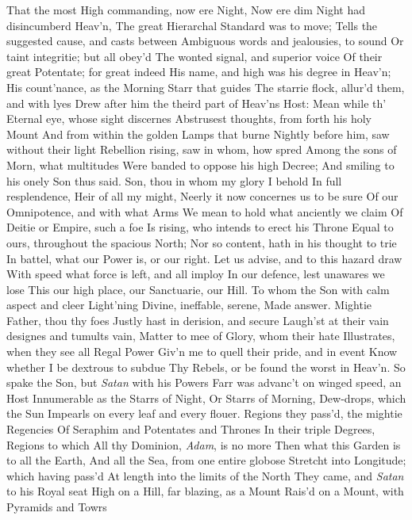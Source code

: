 \documentclass[11pt]{book}
\begin{document}
That the most High commanding, now ere Night, 
Now ere dim Night had disincumberd Heav'n, 
The great Hierarchal Standard was to move; 
Tells the suggested cause, and casts between 
Ambiguous words and jealousies, to sound 
Or taint integritie; but all obey'd 
The wonted signal, and superior voice 
Of their great Potentate; for great indeed 
His name, and high was his degree in Heav'n; 
His count'nance, as the Morning Starr that guides 
The starrie flock, allur'd them, and with lyes 
Drew after him the theird part of Heav'ns Host: 
Mean while th' Eternal eye, whose sight discernes 
Abstrusest thoughts, from forth his holy Mount 
And from within the golden Lamps that burne 
Nightly before him, saw without their light 
Rebellion rising, saw in whom, how spred 
Among the sons of Morn, what multitudes 
Were banded to oppose his high Decree; 
And smiling to his onely Son thus said. 
\quad Son, thou in whom my glory I behold 
In full resplendence, Heir of all my might, 
Neerly it now concernes us to be sure 
Of our Omnipotence, and with what Arms 
We mean to hold what anciently we claim 
Of Deitie or Empire, such a foe 
Is rising, who intends to erect his Throne 
Equal to ours, throughout the spacious North; 
Nor so content, hath in his thought to trie 
In battel, what our Power is, or our right. 
Let us advise, and to this hazard draw 
With speed what force is left, and all imploy 
In our defence, lest unawares we lose 
This our high place, our Sanctuarie, our Hill. 
\quad To whom the Son with calm aspect and cleer 
Light'ning Divine, ineffable, serene, 
Made answer.  Mightie Father, thou thy foes 
Justly hast in derision, and secure 
Laugh'st at their vain designes and tumults vain, 
Matter to mee of Glory, whom their hate 
Illustrates, when they see all Regal Power 
Giv'n me to quell their pride, and in event 
Know whether I be dextrous to subdue 
Thy Rebels, or be found the worst in Heav'n. 
\quad So spake the Son, but \textit{Satan} with his Powers 
Farr was advanc't on winged speed, an Host 
Innumerable as the Starrs of Night, 
Or Starrs of Morning, Dew-drops, which the Sun 
Impearls on every leaf and every flouer. 
Regions they pass'd, the mightie Regencies 
Of Seraphim and Potentates and Thrones 
In their triple Degrees, Regions to which 
All thy Dominion, \textit{Adam}, is no more 
Then what this Garden is to all the Earth, 
And all the Sea, from one entire globose 
Stretcht into Longitude; which having pass'd 
At length into the limits of the North 
They came, and \textit{Satan} to his Royal seat 
High on a Hill, far blazing, as a Mount 
Rais'd on a Mount, with Pyramids and Towrs 
\end{document}
